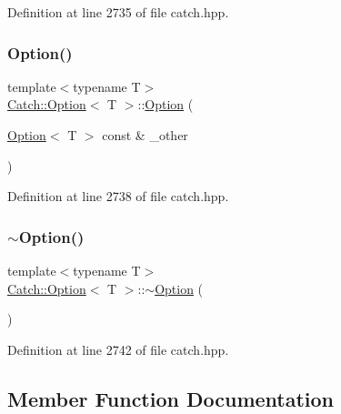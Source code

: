 Definition at line 2735 of file catch.\+hpp.

\hypertarget{class_catch_1_1_option_af02f2e4559f06384baec0def8c68c5fd}{}\label{class_catch_1_1_option_af02f2e4559f06384baec0def8c68c5fd} 
\subsubsection{\texorpdfstring{Option()}{Option()}\hspace{0.1cm}{\footnotesize\ttfamily [3/3]}}
{\footnotesize\ttfamily template$<$typename T$>$ \\
\hyperlink{class_catch_1_1_option}{Catch\+::\+Option}$<$ T $>$\+::\hyperlink{class_catch_1_1_option}{Option} (\begin{DoxyParamCaption}\item[{\hyperlink{class_catch_1_1_option}{Option}$<$ T $>$ const \&}]{\+\_\+other }\end{DoxyParamCaption})\hspace{0.3cm}{\ttfamily [inline]}}



Definition at line 2738 of file catch.\+hpp.

\hypertarget{class_catch_1_1_option_a37fe90bb47bb909f150a5ad6be25581a}{}\label{class_catch_1_1_option_a37fe90bb47bb909f150a5ad6be25581a} 
\subsubsection{\texorpdfstring{$\sim$\+Option()}{~Option()}}
{\footnotesize\ttfamily template$<$typename T$>$ \\
\hyperlink{class_catch_1_1_option}{Catch\+::\+Option}$<$ T $>$\+::$\sim$\hyperlink{class_catch_1_1_option}{Option} (\begin{DoxyParamCaption}{ }\end{DoxyParamCaption})\hspace{0.3cm}{\ttfamily [inline]}}



Definition at line 2742 of file catch.\+hpp.



\subsection{Member Function Documentation}
\hypertarget{class_catch_1_1_option_a821753afdc3fac947a13a01fbe0d248e}{}\label{class_catch_1_1_option_a821753afdc3fac947a13a01fbe0d248e} 

